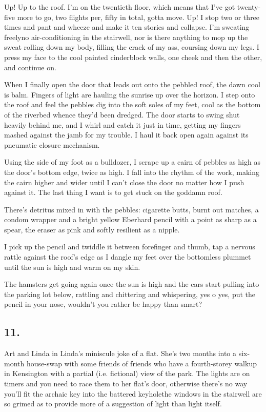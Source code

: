 Up! Up to the roof. I’m on the twentieth floor, which means that
I’ve got twenty-five more to go, two flights per, fifty in total,
gotta move. Up! I stop two or three times and pant and wheeze and
make it ten stories and collapse. I’m sweating freely{\dash}no
air-conditioning in the stairwell, nor is there anything to mop up
the sweat rolling down my body, filling the crack of my ass,
coursing down my legs. I press my face to the cool painted
cinderblock walls, one cheek and then the other, and continue on.

When I finally open the door that leads out onto the pebbled roof,
the dawn cool is balm. Fingers of light are hauling the sunrise up
over the horizon. I step onto the roof and feel the pebbles dig
into the soft soles of my feet, cool as the bottom of the riverbed
whence they’d been dredged. The door starts to swing shut heavily
behind me, and I whirl and catch it just in time, getting my
fingers mashed against the jamb for my trouble. I haul it back open
again against its pneumatic closure mechanism.

Using the side of my foot as a bulldozer, I scrape up a cairn of
pebbles as high as the door’s bottom edge, twice as high. I fall
into the rhythm of the work, making the cairn higher and wider
until I can’t close the door no matter how I push against it. The
last thing I want is to get stuck on the goddamn roof.

There’s detritus mixed in with the pebbles: cigarette butts, burnt
out matches, a condom wrapper and a bright yellow Eberhard pencil
with a point as sharp as a spear, the eraser as pink and softly
resilient as a nipple.

I pick up the pencil and twiddle it between forefinger and thumb,
tap a nervous rattle against the roof’s edge as I dangle my feet
over the bottomless plummet until the sun is high and warm on my
skin.

The hamsters get going again once the sun is high and the cars
start pulling into the parking lot below, rattling and chittering
and whispering, yes o yes, put the pencil in your nose, wouldn’t
you rather be happy than smart?

\subsection{11.}

Art and Linda in Linda’s miniscule joke of a flat. She’s two months
into a six-month house-swap with some friends of friends who have a
fourth-storey walkup in Kensington with a partial (i.e. fictional)
view of the park. The lights are on timers and you need to race
them to her flat’s door, otherwise there’s no way you’ll fit the
archaic key into the battered keyhole{\dash}the windows in the stairwell
are so grimed as to provide more of a suggestion of light than
light itself.

